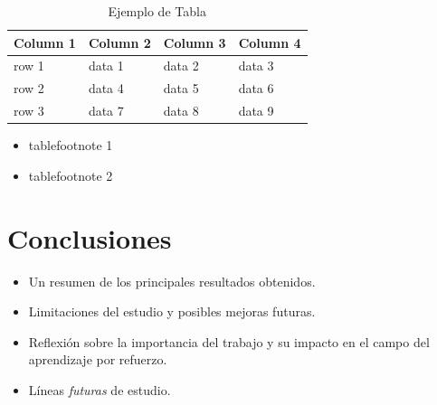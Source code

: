 \begin{table}[htb!]
\caption{Ejemplo de Tabla}\label{tab:1}%
\centering
\begin{tabular}{@{}llll@{}}
\toprule
Column 1 & Column 2  & Column 3 & Column 4\\
\midrule
row 1    & data 1   & data 2  & data 3  \\
row 2    & data 4   & data 5\footnotemark[1]  & data 6  \\
row 3    & data 7   & data 8  & data 9\footnotemark[2]  \\
\bottomrule
\end{tabular}
\begin{itemize}
    \item[$^1$] tablefootnote 1
    \item[$^2$] tablefootnote 2
  \end{itemize}
\end{table}



\section{Conclusiones}
    \begin{itemize}
        \item Un resumen de los principales resultados obtenidos.
        \item Limitaciones del estudio y posibles mejoras futuras.
        \item Reflexión sobre la importancia del trabajo y su impacto en el campo del aprendizaje por refuerzo.
        \item Líneas \textit{futuras} de estudio.
    \end{itemize}

